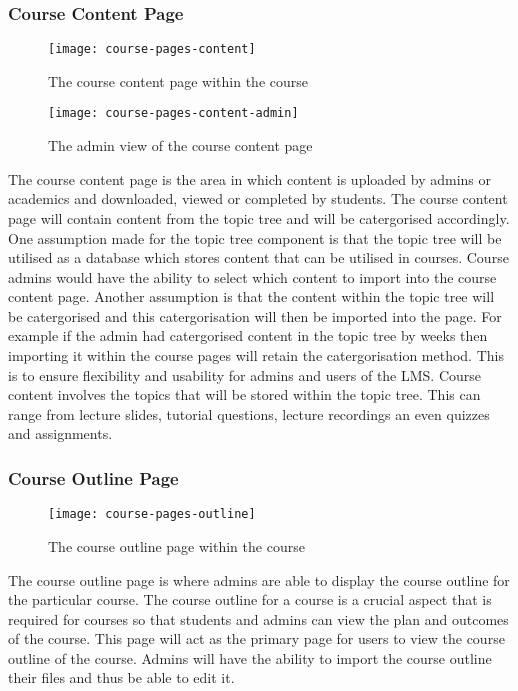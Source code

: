 \subsubsection{Course Content Page}
\begin{figure}[h]
    \centering
    \texttt{[image: course-pages-content]}
    \caption{The course content page within the course}
\end{figure}
\begin{figure}[h]
    \centering
    \texttt{[image: course-pages-content-admin]}
    \caption{The admin view of the course content page}
\end{figure}
The course content page is the area in which content is uploaded by admins or academics and downloaded, viewed or completed by students.
The course content page will contain content from the topic tree and will be catergorised accordingly. 
One assumption made for the topic tree component is that the topic tree will be utilised as a database which stores content that can be utilised in courses.
Course admins would have the ability to select which content to import into the course content page. 
Another assumption is that the content within the topic tree will be catergorised and this catergorisation will then be imported into the page.
For example if the admin had catergorised content in the topic tree by weeks then importing it within the course pages will retain the catergorisation method.
This is to ensure flexibility and usability for admins and users of the LMS.
Course content involves the topics that will be stored within the topic tree. This can range from lecture slides, tutorial questions, lecture recordings an even quizzes and assignments. 


\subsubsection{Course Outline Page}
\begin{figure}[h]
    \centering
    \texttt{[image: course-pages-outline]}
    \caption{The course outline page within the course}
\end{figure}
The course outline page is where admins are able to display the course outline for the particular course. 
The course outline for a course is a crucial aspect that is required for courses so that students and admins can view the plan and outcomes of the course.
This page will act as the primary page for users to view the course outline of the course. 
Admins will have the ability to import the course outline their files and thus be able to edit it.

